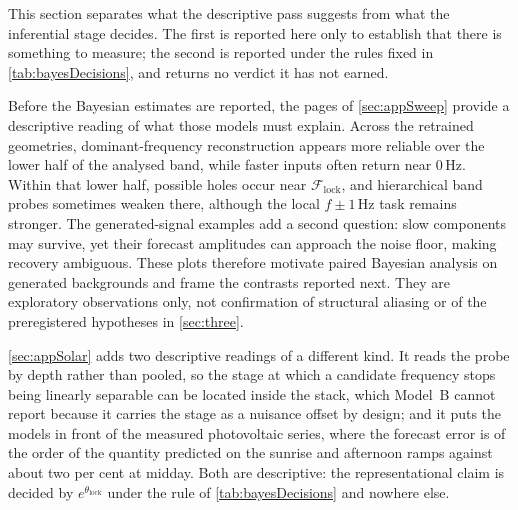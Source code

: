 This section separates what the descriptive pass suggests from what the inferential stage decides. The first is reported here only to establish that there is something to measure; the second is reported under the rules fixed in \autoref{tab:bayesDecisions}, and returns no verdict it has not earned.

Before the Bayesian estimates are reported, the pages of \autoref{sec:appSweep} provide a descriptive reading of what those models must explain. Across the retrained geometries, dominant-frequency reconstruction appears more reliable over the lower half of the analysed band, while faster inputs often return near $0$\,Hz. Within that lower half, possible holes occur near $\mathcal F_{\mathrm{lock}}$, and hierarchical band probes sometimes weaken there, although the local $f\pm1$\,Hz task remains stronger. The generated-signal examples add a second question: slow components may survive, yet their forecast amplitudes can approach the noise floor, making recovery ambiguous. These plots therefore motivate paired Bayesian analysis on generated backgrounds and frame the contrasts reported next. They are exploratory observations only, not confirmation of structural aliasing or of the preregistered hypotheses in \autoref{sec:three}.

\autoref{sec:appSolar} adds two descriptive readings of a different kind. It reads the probe by depth rather than pooled, so the stage at which a candidate frequency stops being linearly separable can be located inside the stack, which Model~B cannot report because it carries the stage as a nuisance offset by design; and it puts the models in front of the measured photovoltaic series, where the forecast error is of the order of the quantity predicted on the sunrise and afternoon ramps against about two per cent at midday. Both are descriptive: the representational claim is decided by $e^{\theta_{\mathrm{lock}}}$ under the rule of \autoref{tab:bayesDecisions} and nowhere else.
